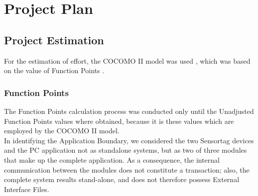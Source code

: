 \documentclass[conference,12pt]{IEEETran}
\begin{document}
\section{Project Plan}

\subsection{Project Estimation}
For the estimation of effort, the COCOMO II model was used \cite{cocomo}, which was based on the value of Function Points \cite{albrecht}.\\

\subsubsection{Function Points}
The Function Points calculation process was conducted only until the Unadjusted Function Points values where obtained, because it is these values which are employed by the COCOMO II model.\\
In identifying the Application Boundary, we considered the two Sensortag devices and the PC application not as standalone systems, but as two of three modules that make up the complete application. As a consequence, the internal communication between the modules does not constitute a transaction; also, the complete system results stand-alone, and does not therefore possess External Interface Files.\\
\end{document}
